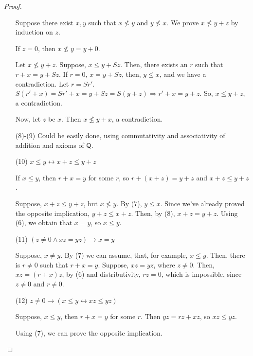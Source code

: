 \documentclass[a4paper,14pt]{article}
\theoremstyle{definition}
\theoremstyle{theorem}
\theoremstyle{lemma}
\theoremstyle{proposition}
\theoremstyle{remark}
\theoremstyle{corollary}
\theoremstyle{problem}
\theoremstyle{hypothesis}
\begin{document}
\begin{proof}
\begin{enumerate}
    Suppose there exist $x, y$ such that $x \nleqslant y$ and $y \nleqslant x$. We prove $x \nleqslant y + z$ by induction on $z$.
    
    If $z = 0$, then $x \nleqslant y = y + 0$.
    
    Let $x \nleqslant y + z$. Suppose, $x \leqslant y + S z$. Then, there exists an $r$ such that $r + x = y + S z$. If $r = 0$, $x = y + S z$, then, $y \leqslant x$, and we have a contradiction. Let $r = S r'$. $S(r' + x) = S r' + x = y + Sz = S(y + z) \Rightarrow r' + x = y + z$. So, $x \leqslant y + z$, a contradiction.
    
    Now, let $z$ be $x$. Then $x \nleqslant y + x$, a contradiction.
    
    \item[(8)-(9)] Could be easily done, using commutativity and associativity of addition and axioms of $\mathsf Q$.
    
    \item[(10)] $x \leqslant y \leftrightarrow x + z \leqslant y + z$
    
    If $x \leqslant y$, then $r + x = y$ for some $r$, so $r + (x + z) = y + z$ and $x + z \leqslant y + z$.
    
    Suppose, $x + z \leqslant y + z$, but $x \nleqslant y$. By (7), $y \leqslant x$. Since we've already proved the opposite implication, $y + z \leqslant x + z$. Then, by (8), $x + z = y + z$. Using (6), we obtain that $x = y$, so $x \leqslant y$.
    
    \item[(11)] $(z \ne 0 \wedge x z = y z) \rightarrow x = y$
    
    Suppose, $x \ne y$. By (7) we can assume, that, for example, $x \leqslant y$. Then, there is $r \ne 0$ such that $r + x = y$. Suppose, $x z = y z$, where $z \ne 0$. Then, $x z = (r + x) z$, by (6) and distributivity, $r z = 0$, which is impossible, since $z \ne 0$ and $r \ne 0$.
    
    \item[(12)] $z \ne 0 \rightarrow (x \leqslant y \leftrightarrow x z \leqslant y z)$
    
    Suppose, $x \leqslant y$, then $r + x = y$ for some $r$. Then $y z = r z + x z$, so $x z \leqslant y z$.
    
    Using (7), we can prove the opposite implication.
    \end{enumerate}
\end{proof}
\end{document}
